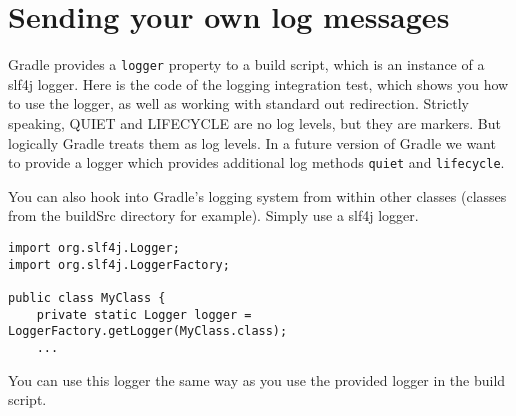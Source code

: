 \section{Sending your own log messages} %
\label{sec:sending_your_own_log_messages}
Gradle provides a \texttt{logger} property to a build script, which is an instance of a slf4j logger. Here is the code of the logging integration test, which shows you how to use the logger, as well as working with standard out redirection.
Strictly speaking, QUIET and LIFECYCLE are no log levels, but they are markers. But logically Gradle treats them as log levels. In a future version of Gradle we want to provide a logger which provides additional log methods \texttt{quiet} and \texttt{lifecycle}.

You can also hook into Gradle's logging system from within other classes (classes from the buildSrc directory for example). Simply use a slf4j logger. 
\begin{Verbatim}
import org.slf4j.Logger;
import org.slf4j.LoggerFactory;	

public class MyClass {
    private static Logger logger = LoggerFactory.getLogger(MyClass.class);
	...
\end{Verbatim}
You can use this logger the same way as you use the provided logger in the build script. 
